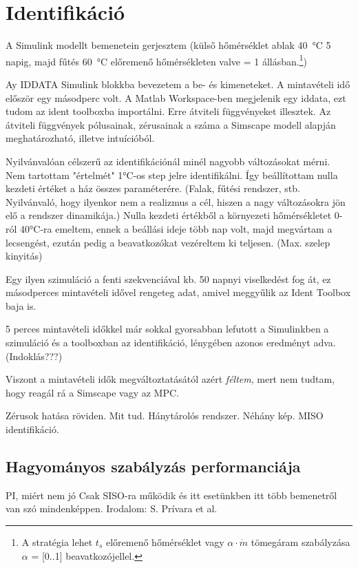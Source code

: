 \chapter{Identifikáció}



A Simulink modellt bemenetein gerjesztem (külső hőmérséklet ablak \SI{40}{\celsius} 5 napig, majd fűtés \SI{60}{\celsius} előremenő hőmérsékleten valve = 1 állásban.\footnote{A stratégia lehet $t_s$ előremenő hőmérséklet vagy $\alpha \cdot \dot m$ tömegáram szabályzása $\alpha$ = [0..1] beavatkozójellel. })


Ay IDDATA Simulink blokkba bevezetem a be- és kimeneteket. A mintavételi idő először egy másodperc volt. A Matlab Workspace-ben megjelenik egy iddata, ezt tudom az ident toolboxba importálni. Erre átviteli függvényeket illesztek. Az átviteli függvények pólusainak, zérusainak a száma a Simscape modell alapján meghatározható, illetve intuícióból.

Nyilvánvalóan célszerű az identifikációnál minél nagyobb változásokat mérni. Nem tartottam "értelmét" 1\si{\celsius}-os step jelre identifikálni. Így beállítottam nulla kezdeti értéket a ház összes paraméterére. (Falak, fűtési rendszer, stb. Nyilvánvaló, hogy ilyenkor nem a realizmus a cél, hiszen a nagy változásokra jön elő a rendszer dinamikája.) Nulla kezdeti értékből a környezeti hőmérsékletet 0-ról 40\si{\celsius}-ra emeltem, ennek a beállási ideje több nap volt, majd megvártam a lecsengést, ezután pedig a beavatkozókat vezéreltem ki teljesen. (Max. szelep kinyitás)

Egy ilyen szimuláció a fenti szekvenciával kb. 50 napnyi viselkedést fog át, ez másodperces mintavételi idővel rengeteg adat, amivel meggyűlik az Ident Toolbox baja is.

5 perces mintavételi időkkel már sokkal gyorsabban lefutott a Simulinkben a szimuláció és a toolboxban az identifikáció, lénygében azonos eredményt adva. (Indoklás???)

Viszont a mintavételi idők megváltoztatásától azért \textit{féltem}, mert nem tudtam, hogy reagál rá a Simscape vagy az MPC.

Zérusok hatása röviden. Mit tud. Hánytárolós rendszer. Néhány kép.
MISO identifikáció. 


\section{Hagyományos szabályzás performanciája}

PI, miért nem jó
Csak SISO-ra működik és itt esetünkben itt több bemenetről van szó mindenképpen. Irodalom: S. Prívara et al. 



\pagebreak